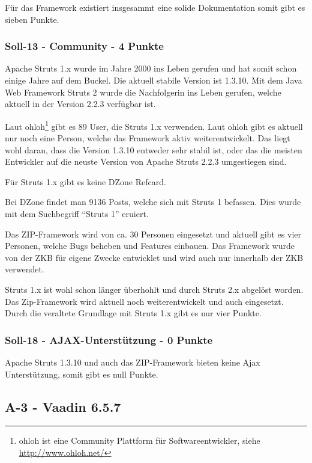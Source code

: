   Für das Framework existiert insgesammt eine solide Dokumentation somit gibt es
  sieben Punkte.
  
  \subsubsection{Soll-13 - Community - 4 Punkte}
  
  Apache Struts 1.x wurde im Jahre 2000 ins Leben gerufen und hat somit schon
  einige Jahre auf dem Buckel. Die aktuell stabile Version ist 1.3.10. Mit dem
  Java Web Framework Struts 2 wurde die Nachfolgerin ins Leben gerufen, welche
  aktuell in der Version 2.2.3 verfügbar ist.
  
  Laut ohloh\footnote{ohloh ist eine Community Plattform für
  Softwareentwickler, siehe \url{http://www.ohloh.net/}} gibt es 89 User, die
  Struts 1.x verwenden. Laut ohloh gibt es aktuell nur noch eine Person, welche
  das Framework aktiv weiterentwickelt. Das liegt wohl daran, dass die Version
  1.3.10 entweder sehr stabil ist, oder das die meisten Entwickler auf die 
  neuste Version von Apache Struts 2.2.3 umgestiegen sind.
  
  Für Struts 1.x gibt es keine DZone Refcard.
  
  Bei DZone findet man 9136 Posts, welche sich mit Struts 1 befassen. Dies wurde
  mit dem Suchbegriff ``Struts 1'' eruiert.
  
  Das ZIP-Framework wird von ca. 30 Personen eingesetzt und aktuell gibt es vier
  Personen, welche Bugs beheben und Features einbauen. Das Framework wurde von
  der \ac{ZKB} für eigene Zwecke entwicklet und wird auch nur innerhalb der
  \ac{ZKB} verwendet.
  
  Struts 1.x ist wohl schon länger überhohlt und durch Struts 2.x abgelöst
  worden. Das Zip-Framework wird aktuell noch weiterentwickelt und auch
  eingesetzt. Durch die veraltete Grundlage mit Struts 1.x gibt es nur vier
  Punkte.

  \subsubsection{Soll-18 - AJAX-Unterstützung - 0 Punkte}
  
  Apache Struts 1.3.10 und auch das ZIP-Framework bieten keine \ac{Ajax}
  Unterstützung, somit gibt es null Punkte.
  
  \subsection{A-3 - Vaadin 6.5.7}
  
